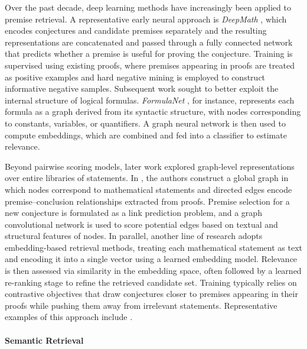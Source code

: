 \documentclass[11pt]{article}
\numberwithin{equation}{section}
\begin{document}
Over the past decade, deep learning methods have increasingly been applied to premise retrieval. A representative early neural approach is \textit{DeepMath} \cite{irving2016deepmath}, which encodes conjectures and candidate premises separately and the resulting representations are concatenated and passed through a fully connected network that predicts whether a premise is useful for proving the conjecture. Training is supervised using existing proofs, where premises appearing in proofs are treated as positive examples and hard negative mining is employed to construct informative negative samples. Subsequent work sought to better exploit the internal structure of logical formulas. \textit{FormulaNet} \cite{wang2017premise}, for instance, represents each formula as a graph derived from its syntactic structure, with nodes corresponding to constants, variables, or quantifiers. A graph neural network is then used to compute embeddings, which are combined and fed into a classifier to estimate relevance.

Beyond pairwise scoring models, later work explored graph-level representations over entire libraries of statements. In \cite{ferreira-freitas-2020-premise}, the authors construct a global graph in which nodes correspond to mathematical statements and directed edges encode premise–conclusion relationships extracted from proofs. Premise selection for a new conjecture is formulated as a link prediction problem, and a graph convolutional network is used to score potential edges based on textual and structural features of nodes. In parallel, another line of research adopts embedding-based retrieval methods, treating each mathematical statement as text and encoding it into a single vector using a learned embedding model. Relevance is then assessed via similarity in the embedding space, often followed by a learned re-ranking stage to refine the retrieved candidate set. Training typically relies on contrastive objectives that draw conjectures closer to premises appearing in their proofs while pushing them away from irrelevant statements. Representative examples of this approach include \cite{yang2023leandojo,tao2025learning,shen2025real}.




\paragraph{Semantic Retrieval} 
\end{document}
